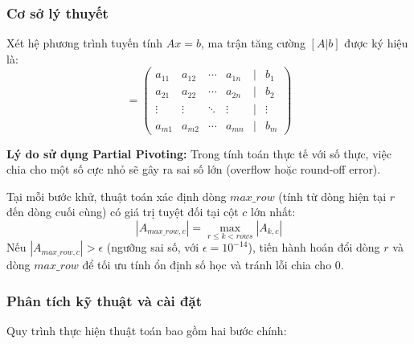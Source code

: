 \documentclass[12pt,a4paper]{article}
\begin{document}
\subsubsection{Cơ sở lý thuyết}

\begin{infobox}
Xét hệ phương trình tuyến tính $Ax = b$, ma trận tăng cường $[A | b]$ được ký hiệu là:
\begin{equation}
[A | b] = \begin{pmatrix}
a_{11} & a_{12} & \cdots & a_{1n} & | & b_1 \\
a_{21} & a_{22} & \cdots & a_{2n} & | & b_2 \\
\vdots & \vdots & \ddots & \vdots & | & \vdots \\
a_{m1} & a_{m2} & \cdots & a_{mn} & | & b_m
\end{pmatrix}
\end{equation}
\end{infobox}

\textbf{Lý do sử dụng Partial Pivoting:} Trong tính toán thực tế với số thực, việc chia cho một số cực nhỏ sẽ gây ra sai số lớn (overflow hoặc round-off error). 

\begin{infobox}
Tại mỗi bước khử, thuật toán xác định dòng $max\_row$ (tính từ dòng hiện tại $r$ đến dòng cuối cùng) có giá trị tuyệt đối tại cột $c$ lớn nhất:
\begin{equation}
|A_{max\_row, c}| = \max_{r \le k < rows} |A_{k, c}|
\end{equation}
Nếu $|A_{max\_row, c}| > \epsilon$ (ngưỡng sai số, với $\epsilon = 10^{-14}$), tiến hành hoán đổi dòng $r$ và dòng $max\_row$ để tối ưu tính ổn định số học và tránh lỗi chia cho $0$.
\end{infobox}

\subsubsection{Phân tích kỹ thuật và cài đặt}
Quy trình thực hiện thuật toán bao gồm hai bước chính:
\end{document}
